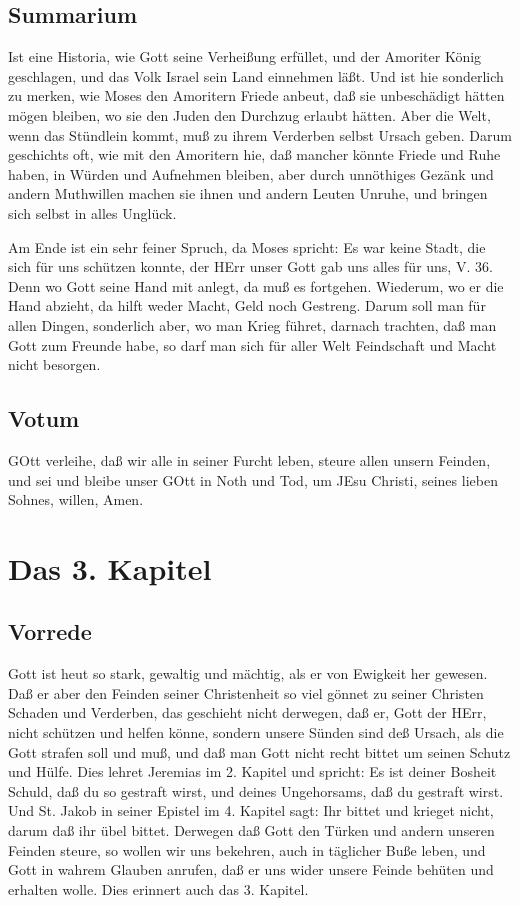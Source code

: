 \section{Summarium}

Ist eine Historia, wie Gott seine Verheißung erfüllet, und der Amoriter König geschlagen, und das Volk Israel sein Land einnehmen läßt. Und ist hie sonderlich zu merken, wie Moses den Amoritern Friede anbeut, daß sie unbeschädigt hätten mögen bleiben, wo sie den Juden den Durchzug erlaubt hätten. Aber die Welt, wenn das Stündlein kommt, muß zu ihrem Verderben selbst Ursach geben. Darum geschichts oft, wie mit den Amoritern hie, daß mancher könnte Friede und Ruhe haben, in Würden und Aufnehmen bleiben, aber durch unnöthiges Gezänk und andern Muthwillen machen sie ihnen und andern Leuten Unruhe, und bringen sich selbst in alles Unglück.

Am Ende ist ein sehr feiner Spruch, da Moses spricht: Es war keine Stadt, die sich für uns schützen konnte, der HErr unser Gott gab uns alles für uns, V. 36. Denn wo Gott seine Hand mit anlegt, da muß es fortgehen. Wiederum, wo er die Hand abzieht, da hilft weder Macht, Geld noch Gestreng. Darum soll man für allen Dingen, sonderlich aber, wo man Krieg führet, darnach trachten, daß man Gott zum Freunde habe, so darf man sich für aller Welt Feindschaft und Macht nicht besorgen.

\section{Votum}

GOtt verleihe, daß wir alle in seiner Furcht leben, steure allen unsern Feinden, und sei und bleibe unser GOtt in Noth und Tod, um JEsu Christi, seines lieben Sohnes, willen, Amen.

\chapter{Das 3. Kapitel}

\section{Vorrede}

Gott ist heut so stark, gewaltig und mächtig, als er von Ewigkeit her gewesen. Daß er aber den Feinden seiner Christenheit so viel gönnet zu seiner Christen Schaden und Verderben, das geschieht nicht derwegen, daß er, Gott der HErr, nicht schützen und helfen könne, sondern unsere Sünden sind deß Ursach, als die Gott strafen soll und muß, und daß man Gott nicht recht bittet um seinen Schutz und Hülfe. Dies lehret Jeremias im 2. Kapitel und spricht: Es ist deiner Bosheit Schuld, daß du so gestraft wirst, und deines Ungehorsams, daß du gestraft wirst. Und St. Jakob in seiner Epistel im 4. Kapitel sagt: Ihr bittet und krieget nicht, darum daß ihr übel bittet. Derwegen daß Gott den Türken und andern unseren Feinden steure, so wollen wir uns bekehren, auch in täglicher Buße leben, und Gott in wahrem Glauben anrufen, daß er uns wider unsere Feinde behüten und erhalten wolle. Dies erinnert auch das 3. Kapitel.

